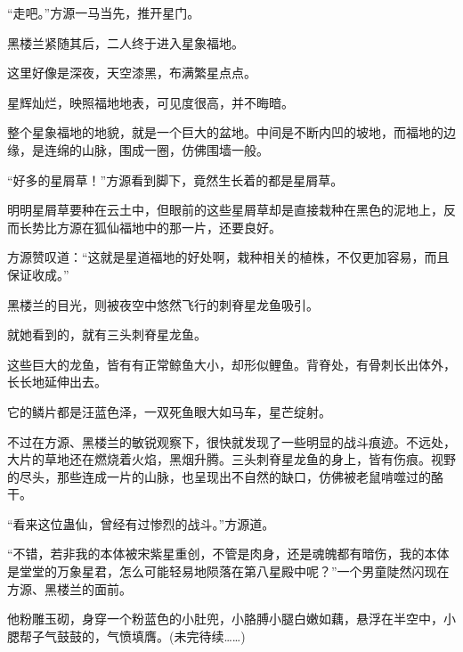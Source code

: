\begin{this_body}
“走吧。”方源一马当先，推开星门。

黑楼兰紧随其后，二人终于进入星象福地。

这里好像是深夜，天空漆黑，布满繁星点点。

星辉灿烂，映照福地地表，可见度很高，并不晦暗。

整个星象福地的地貌，就是一个巨大的盆地。中间是不断内凹的坡地，而福地的边缘，是连绵的山脉，围成一圈，仿佛围墙一般。

“好多的星屑草！”方源看到脚下，竟然生长着的都是星屑草。

明明星屑草要种在云土中，但眼前的这些星屑草却是直接栽种在黑色的泥地上，反而长势比方源在狐仙福地中的那一片，还要良好。

方源赞叹道：“这就是星道福地的好处啊，栽种相关的植株，不仅更加容易，而且保证收成。”

黑楼兰的目光，则被夜空中悠然飞行的刺脊星龙鱼吸引。

就她看到的，就有三头刺脊星龙鱼。

这些巨大的龙鱼，皆有有正常鲸鱼大小，却形似鲤鱼。背脊处，有骨刺长出体外，长长地延伸出去。

它的鳞片都是汪蓝色泽，一双死鱼眼大如马车，星芒绽射。

不过在方源、黑楼兰的敏锐观察下，很快就发现了一些明显的战斗痕迹。不远处，大片的草地还在燃烧着火焰，黑烟升腾。三头刺脊星龙鱼的身上，皆有伤痕。视野的尽头，那些连成一片的山脉，也呈现出不自然的缺口，仿佛被老鼠啃噬过的酪干。

“看来这位蛊仙，曾经有过惨烈的战斗。”方源道。

“不错，若非我的本体被宋紫星重创，不管是肉身，还是魂魄都有暗伤，我的本体是堂堂的万象星君，怎么可能轻易地陨落在第八星殿中呢？”一个男童陡然闪现在方源、黑楼兰的面前。

他粉雕玉砌，身穿一个粉蓝色的小肚兜，小胳膊小腿白嫩如藕，悬浮在半空中，小腮帮子气鼓鼓的，气愤填膺。(未完待续……)

\end{this_body}

